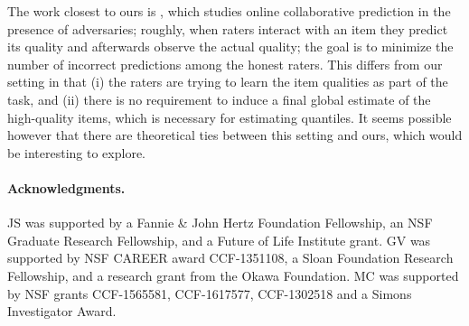 
The work closest to ours is , which studies online collaborative prediction in 
the presence of adversaries; roughly, when raters interact with an item 
they predict its quality and afterwards observe the actual quality; the 
goal is to minimize the number of incorrect 
predictions among the honest raters. This differs from our setting in that 
(i) the raters are trying to learn the item qualities as part of the task, 
and (ii) there is no requirement to induce a final global estimate of the 
high-quality items, which is necessary for estimating quantiles.
It seems possible however that there are theoretical ties between this 
setting and ours, which would be interesting to explore.

{\small
\paragraph{Acknowledgments.}
JS was supported by a Fannie \& John Hertz Foundation Fellowship,
an NSF Graduate Research Fellowship, and a Future of Life Institute 
grant. GV was supported by NSF CAREER 
award CCF-1351108, a Sloan Foundation Research Fellowship, and a research 
grant from the Okawa Foundation. MC was supported by NSF grants 
CCF-1565581, CCF-1617577, CCF-1302518 and a Simons Investigator Award.}
